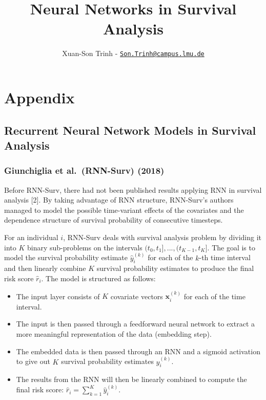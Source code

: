 \documentclass[
]{article}
\title{\textbf{Neural Networks in Survival Analysis}}
\author{Xuan-Son Trinh - \href{mailto:Son.Trinh@campus.lmu.de}{\nolinkurl{Son.Trinh@campus.lmu.de}}}
\date{}
\providecommand{\tightlist}{%
  \setlength{\itemsep}{0pt}\setlength{\parskip}{0pt}}
\begin{document}
\maketitle

{
\setcounter{tocdepth}{5}
\tableofcontents
}
\setlength{\parindent}{0pt}

\appendix

\hypertarget{appendix}{%
\section{Appendix}\label{appendix}}

\hypertarget{recurrent-neural-network-models-in-survival-analysis}{%
\subsection{Recurrent Neural Network Models in Survival Analysis}\label{recurrent-neural-network-models-in-survival-analysis}}

\hypertarget{giunchiglia-et-al.-rnn-surv-2018}{%
\subsubsection{Giunchiglia et al.~(RNN-Surv) (2018)}\label{giunchiglia-et-al.-rnn-surv-2018}}

Before RNN-Surv, there had not been published results applying RNN in survival analysis {[}2{]}. By taking advantage of RNN structure, RNN-Surv's authors managed to model the possible time-variant effects of the covariates and the dependence structure of survival probability of consecutive timesteps.

For an individual \(i\), RNN-Surv deals with survival analysis problem by dividing it into \(K\) binary sub-problems on the intervals \((t_0,t_1],...,(t_{K-1},t_K]\). The goal is to model the survival probability estimate \(\hat{y}_i^{(k)}\) for each of the \(k\)-th time interval and then linearly combine \(K\) survival probability estimates to produce the final risk score \(\hat{r}_i\). The model is structured as follows:
\vspace{-0.5cm}

\begin{itemize}
\tightlist
\item
  The input layer consists of \(K\) covariate vectors \(\mathbf{x}_i^{(k)}\) for each of the time interval.
\item
  The input is then passed through a feedforward neural network to extract a more meaningful representation of the data (embedding step).
\item
  The embedded data is then passed through an RNN and a sigmoid activation to give out \(K\) survival probability estimates \(\hat{y}_i^{(k)}\).
\item
  The results from the RNN will then be linearly combined to compute the final risk score: \(\hat{r}_i = \sum_{k = 1}^{K} \hat{y}_i^{(k)}\).
\end{itemize}
\end{document}

